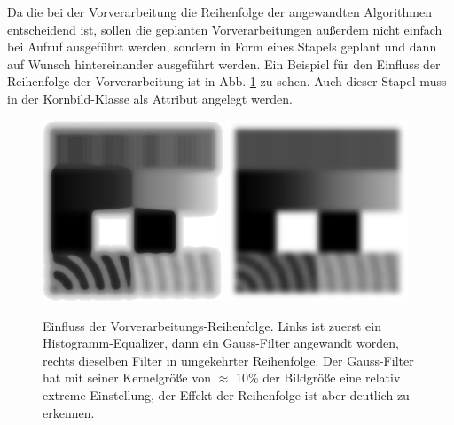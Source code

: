 \documentclass[
  12pt,
]{book}
\begin{document}
Da die bei der Vorverarbeitung die Reihenfolge der angewandten Algorithmen entscheidend ist, sollen die geplanten Vorverarbeitungen außerdem nicht einfach bei Aufruf ausgeführt werden, sondern in Form eines Stapels geplant und dann auf Wunsch hintereinander ausgeführt werden. Ein Beispiel für den Einfluss der Reihenfolge der Vorverarbeitung ist in Abb. \ref{fig:prepOrder} zu sehen. Auch dieser Stapel muss in der Kornbild-Klasse als Attribut angelegt werden.





\begin{figure}

{\centering \includegraphics[width=0.48\textwidth]{../imgs/gauss_hist} \includegraphics[width=0.48\textwidth]{../imgs/hist_gauss} 

}

\caption[Einfluss der Vorverarbeitungs-Reihenfolge.]{Einfluss der Vorverarbeitungs-Reihenfolge. Links ist zuerst ein Histogramm-Equalizer, dann ein Gauss-Filter angewandt worden, rechts dieselben Filter in umgekehrter Reihenfolge. Der Gauss-Filter hat mit seiner Kernelgröße von \(\approx\) 10\% der Bildgröße eine relativ extreme Einstellung, der Effekt der Reihenfolge ist aber deutlich zu erkennen.}\label{fig:prepOrder}
\end{figure}
\end{document}
